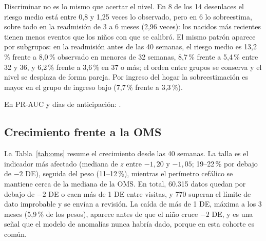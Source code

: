 Discriminar no es lo mismo que acertar el nivel. En 8 de los 14 desenlaces el riesgo medio está entre 0,8 y 1,25 veces lo observado, pero en 6 lo sobreestima, sobre todo en la readmisión de 3 a 6 meses (2,96 veces): los nacidos más recientes tienen menos eventos que los niños con que se calibró. El mismo patrón aparece por subgrupos: en la readmisión antes de las 40 semanas, el riesgo medio es 13,2\,\% frente a 8,0\,\% observado en menores de 32 semanas, 8,7\,\% frente a 5,4\,\% entre 32 y 36, y 6,2\,\% frente a 3,6\,\% en 37 o más; el orden entre grupos se conserva y el nivel se desplaza de forma pareja. Por ingreso del hogar la sobreestimación es mayor en el grupo de ingreso bajo (7,7\,\% frente a 3,3\,\%).

En PR-AUC y días de anticipación: .

\subsection{Crecimiento frente a la OMS}
\label{sec:res-oms}
La Tabla~\ref{tab:oms} resume el crecimiento desde las 40 semanas. La talla es el indicador más afectado (mediana de $z$ entre $-1{,}20$ y $-1{,}05$; 19--22\,\% por debajo de $-2$ DE), seguida del peso (11--12\,\%), mientras el perímetro cefálico se mantiene cerca de la mediana de la OMS. En total, 60.315 datos quedan por debajo de $-2$ DE o caen más de 1 DE entre visitas, y 770 superan el límite de dato improbable y se envían a revisión. La caída de más de 1 DE, máxima a los 3 meses (5,9\,\% de los pesos), aparece antes de que el niño cruce $-2$ DE, y es una señal que el modelo de anomalías nunca habría dado, porque en esta cohorte es común.

